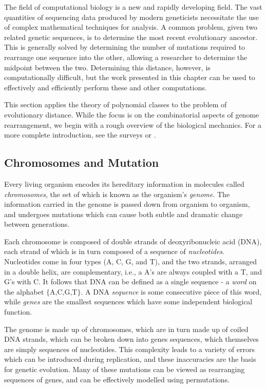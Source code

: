 \documentclass[12pt,twoside]{memoir}
\begin{document}
    The field of computational biology is a new and rapidly developing field.
    The vast quantities of sequencing data produced by modern geneticists
    necessitate the use of complex mathematical techniques for analysis.
    A common problem, given two related genetic sequences, is to determine the
    most recent evolutionary ancestor. This is generally solved by determining
    the number of mutations required to rearrange one sequence into the other,
    allowing a researcher to determine the midpoint between the two. Determining
    this distance, however, is computationally difficult, but the work presented
    in this chapter can be used to effectively and efficiently perform these and
    other computations. 
    
    This section applies the theory of polynomial classes to the problem of
    evolutionary distance. 
    While the focus is on the combinatorial aspects of genome
    rearrangement, we begin with a rough overview of the biological mechanics.
    For a more complete introduction, see the surveys \cite{CompBio} or
    \cite{GenomeBook}.
    

    \subsection{Chromosomes and Mutation}
        
      Every living organism encodes its hereditary information in molecules
      called \emph{chromosomes}, the set of which is known as the organism's
      \emph{genome}. The information carried in the genome is passed down from
      organism to organism, and undergoes mutations which can cause both subtle
      and dramatic change between generations. 
    
      Each chromosome is composed of double strands of deoxyribonucleic acid
      (DNA), each strand of which is in turn composed of a sequence of
      \emph{nucleotides}. Nucleotides come in four types (A, C, G, and T), and
      the two strands, arranged in a double helix, are complementary, i.e., a A's
      are always coupled with a T, and G's with C. It follows that DNA can be
      defined as a single sequence - a \emph{word} on the alphabet
      $\{\text{A,C,G,T}\}$. A DNA \emph{sequence} is some consecutive piece of
      this word, while \emph{genes} are the smallest sequences which have some
      independent biological function.
      
      The genome is made up of chromosomes, which are in turn made up of coiled
      DNA strands, which can be broken down into genes sequences, which
      themselves are simply sequences of nucleotides. This complexity leads to
      a variety of errors which can be introduced during replication, and these
      inaccuracies are the basis for genetic evolution. Many of these
      mutations can be viewed as rearranging sequences of genes, and can be
      effectively modelled using permutations. 
\end{document}
